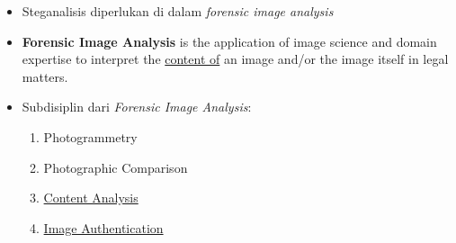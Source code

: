 \documentclass{article}
\begin{document}

\begin{itemize}
    \item Steganalisis diperlukan di dalam \textit{forensic image analysis}
    \item \textbf{Forensic Image Analysis} is the application of image science and domain expertise to interpret the \underline{content of} an image and/or the image itself in legal matters.
    \item Subdisiplin dari \textit{Forensic Image Analysis}:
    \begin{enumerate}
        \item Photogrammetry
        \item Photographic Comparison
        \item \underline{Content Analysis}
        \item \underline{Image Authentication}
    \end{enumerate}
\end{itemize}
\end{document}
